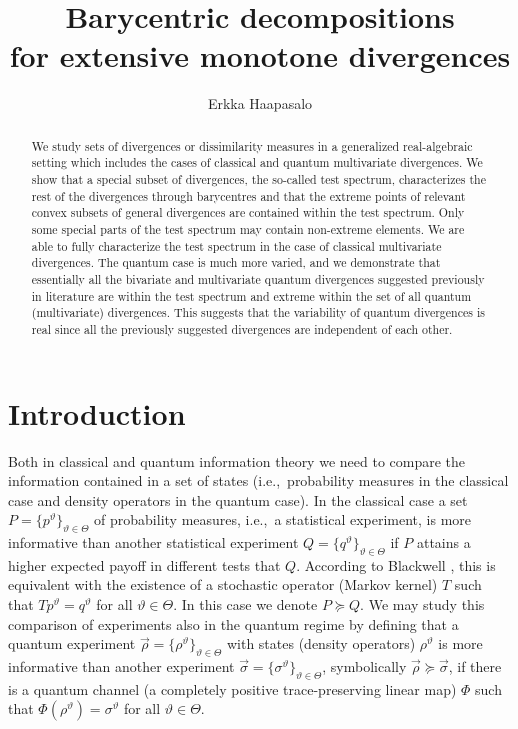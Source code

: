 \documentclass[12pt,a4paper,reqno]{amsart}
\theoremstyle{definition}
\newcommand{\tj}{\vartheta}
\begin{document}
\title{Barycentric decompositions\\ for extensive monotone divergences}

\author{Erkka Haapasalo}
\address{Centre for Quantum  Technologies,  National University of Singapore}

\begin{abstract}
We study sets of divergences or dissimilarity measures in a generalized real-algebraic setting which includes the cases of classical and quantum multivariate divergences. We show that a special subset of divergences, the so-called test spectrum, characterizes the rest of the divergences through barycentres and that the extreme points of relevant convex subsets of general divergences are contained within the test spectrum. Only some special parts of the test spectrum may contain non-extreme elements. We are able to fully characterize the test spectrum in the case of classical multivariate divergences. The quantum case is much more varied, and we demonstrate that essentially all the bivariate and multivariate quantum divergences suggested previously in literature are within the test spectrum and extreme within the set of all quantum (multivariate) divergences. This suggests that the variability of quantum divergences is real since all the previously suggested divergences are independent of each other.
\end{abstract}

\maketitle

\section{Introduction}

Both in classical and quantum information theory we need to compare the information contained in a set of states (i.e.,\ probability measures in the classical case and density operators in the quantum case). In the classical case a set $P=\{p^{\tj}\}_{\tj\in\Theta}$ of probability measures, i.e.,\ a statistical experiment, is more informative than another statistical experiment $Q=\{q^\tj\}_{\tj\in\Theta}$ if $P$ attains a higher expected payoff in different tests that $Q$. According to Blackwell \cite{Blackwell51,Blackwell53}, this is equivalent with the existence of a stochastic operator (Markov kernel) $T$ such that $Tp^\tj=q^\tj$ for all $\tj\in\Theta$. In this case we denote $P\succeq Q$. We may study this comparison of experiments also in the quantum regime by defining that a quantum experiment $\vec{\rho}=\{\rho^\tj\}_{\tj\in\Theta}$ with states (density operators) $\rho^\tj$ is more informative than another experiment $\vec{\sigma}=\{\sigma^\tj\}_{\tj\in\Theta}$, symbolically $\vec{\rho}\succeq\vec{\sigma}$, if there is a quantum channel (a completely positive trace-preserving linear map) $\Phi$ such that $\Phi(\rho^\tj)=\sigma^\tj$ for all $\tj\in\Theta$.
\end{document}
